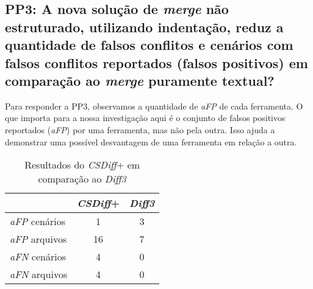 \subsection{PP3: A nova solução de \emph{merge} não estruturado, utilizando
indentação, reduz a quantidade de falsos conflitos e cenários com falsos
conflitos reportados (falsos positivos) em comparação ao \emph{merge} puramente
textual?}

Para responder a PP3, observamos a quantidade de \emph{aFP} de cada ferramenta.
O que importa para a nossa investigação aqui é o conjunto de falsos positivos
reportados (\emph{aFP}) por uma ferramenta, mas não pela outra. Isso ajuda a
demonstrar uma possível desvantagem de uma ferramenta em relação a outra.

\begin{table}[ht]
	\begin{center}
		\begin{tabular}{|l|c|c|}
			\hline
			\textbf{ }          & \textbf{\emph{CSDiff}+} & \textbf{\emph{Diff3}} \\
			\hline
			\emph{aFP} cenários & 1                       & 3                     \\
			\emph{aFP} arquivos & 16                      & 7                     \\
			\emph{aFN} cenários & 4                       & 0                     \\
			\emph{aFN} arquivos & 4                       & 0                     \\
			\hline
		\end{tabular}
	\end{center}
	\caption{Resultados do \emph{CSDiff}+ em comparação ao \emph{Diff3}}\label{csdiff_plus_afp_afn}
\end{table}

